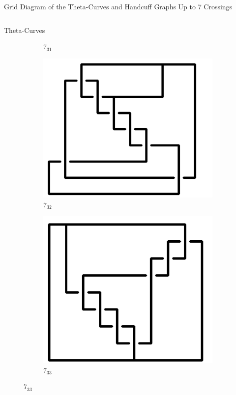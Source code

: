 \documentclass[final]{beamer}
\begin{document}
\begin{frame}[t]
\begin{alertblock}{Grid Diagram of the Theta-Curves and Handcuff Graphs Up to 7 Crossings}
\begin{columns}[t]
\begin{column}{0.5\textwidth}
\begin{alertblock}{Theta-Curves}
\begin{figure}
\begin{subfigure}{0.075\textwidth}
    \caption{$7_{31}$} 
    \end{subfigure}
    \begin{subfigure}{0.075\textwidth}
    \includegraphics[width=\columnwidth]{../Midterm_Poster/grid_diagram/theta_7_32.png}
    \caption{$7_{32}$} 
    \end{subfigure}
    \begin{subfigure}{0.075\textwidth}
    \includegraphics[width=\columnwidth]{../Midterm_Poster/grid_diagram/theta_7_33.png}
    \caption{$7_{33}$} 

\end{subfigure}
\end{figure}
\end{alertblock}
\end{column}
\end{columns}
\end{alertblock}
\end{frame}
\end{document}
